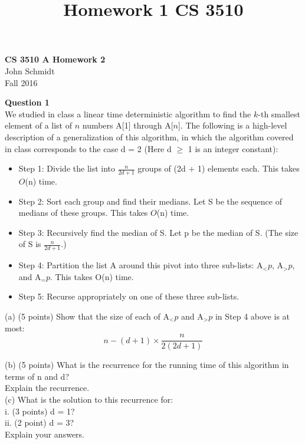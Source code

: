 \documentclass[11pt]{article}
\begin{document}
\title{Homework 1 CS 3510}

\thispagestyle{empty}

\begin{center}
{\LARGE \bf CS 3510 A Homework 2}\\
{\large John Schmidt}\\
Fall 2016
\end{center}

\textbf{Question 1}\\
We studied in class a linear time deterministic algorithm to find the $\textit{k}$-th smallest element of a list
of $\textit{n}$ numbers A[1] through A[$\textit{n}$]. The following is a high-level description of a generalization of this
algorithm, in which the algorithm covered in class corresponds to the case d = 2 (Here d $\geq$ 1 is an
integer constant):
\begin{itemize}
\item Step 1: Divide the list into $\frac{n}{2d + 1}$ groups of (2d + 1) elements each. This takes $\textit{O}$(n) time.
\item Step 2: Sort each group and find their medians. Let S be the sequence of medians of these groups.
This takes $\textit{O}$(n) time.
\item Step 3: Recursively find the median of S. Let p be the median of S. (The size of S is $\frac{n}{2d + 1}$.)
\item Step 4: Partition the list A around this pivot into three sub-lists: A$_< p$, A$_> p$, and A$_= p$. This
takes O(n) time.
\item Step 5: Recurse appropriately on one of these three sub-lists.
\end{itemize}

(a) (5 points) Show that the size of each of A$_< p$ and A$_> p$ in Step 4 above is at most:
\begin{equation}
n - (d + 1) \times  \frac{n}{2(2d + 1)}
\end{equation}

(b) (5 points) What is the recurrence for the running time of this algorithm in terms of n and d?\\
Explain the recurrence.
\\

(c) What is the solution to this recurrence for: \\
i. (3 points) d = 1? \\
ii. (2 point) d = 3? \\
Explain your answers.
\end{document}
